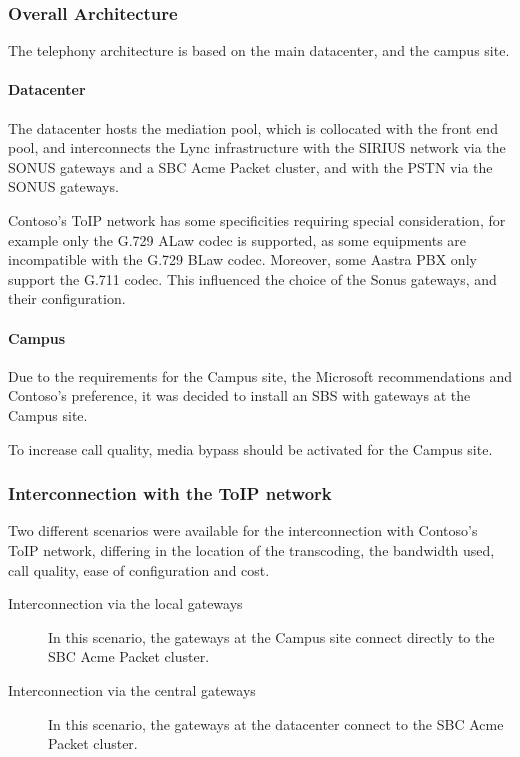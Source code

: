 \subsubsection{Overall Architecture}
	The telephony architecture is based on the main datacenter, and the campus site.

	\paragraph{Datacenter}
	The datacenter hosts the mediation pool, which is collocated with the front end pool, and interconnects the Lync infrastructure with the SIRIUS network via the SONUS gateways and a SBC Acme Packet cluster, and with the PSTN via the SONUS gateways.
	
	Contoso's ToIP network has some specificities requiring special consideration, for example only the G.729 ALaw codec is supported, as some equipments are incompatible with the G.729 BLaw codec. Moreover, some Aastra PBX only support the G.711 codec. This influenced the choice of the Sonus gateways, and their configuration.
	

	\paragraph{Campus}
	Due to the requirements for the Campus site, the Microsoft recommendations and Contoso's preference, it was decided to install an SBS with gateways at the Campus site.
	
	To increase call quality, media bypass should be activated for the Campus site.


\subsubsection{Interconnection with the ToIP network}
	Two different scenarios were available for the interconnection with Contoso's ToIP network, differing in the location of the transcoding, the bandwidth used, call quality, ease of configuration and cost.
	\begin{description}
		\item[Interconnection via the local gateways] 
			In this scenario, the gateways at the Campus site connect directly to the SBC Acme Packet cluster.
		\item[Interconnection via the central gateways] 
			In this scenario, the gateways at the datacenter connect to the SBC Acme Packet cluster.
	\end{description}
	
